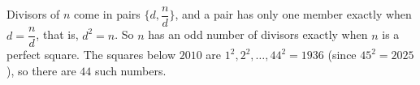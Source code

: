 Divisors of $n$ come in pairs $\{d,\dfrac{n}{d}\}$, and a pair has only one member exactly when $d=\dfrac{n}{d}$, that is, $d^2=n$. So $n$ has an odd number of divisors exactly when $n$ is a perfect square. The squares below $2010$ are $1^2,2^2,\dots,44^2=1936$ (since $45^2=2025$), so there are $\boxed{44}$ such numbers.
